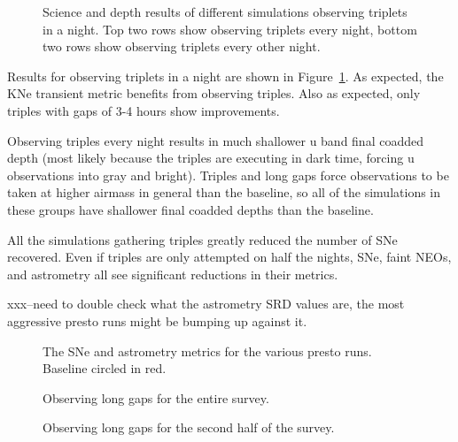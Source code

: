 \begin{figure}

\caption{ Science and depth results of different simulations observing triplets in a night. Top two rows show observing triplets every night, bottom two rows show observing triplets every other night. \label{fig:presto}}
\end{figure}


Results for observing triplets in a night are shown in Figure~\ref{fig:presto}. As expected, the KNe transient metric benefits from observing triples. Also as expected, only triples with gaps of 3-4 hours show improvements.  

Observing triples every night results in much shallower u band final coadded depth (most likely because the triples are executing in dark time, forcing u observations into gray and bright). Triples and long gaps force observations to be taken at higher airmass in general than the baseline, so all of the simulations in these groups have shallower final coadded depths than the baseline.

All the simulations gathering triples greatly reduced the number of SNe recovered. Even if triples are only attempted on half the nights, SNe, faint NEOs, and astrometry all see significant reductions in their metrics.


xxx--need to double check what the astrometry SRD values are, the most aggressive presto runs might be bumping up against it.

\begin{figure}
\caption{The SNe and astrometry metrics for the various presto runs. Baseline circled in red. \label{fig:presto_metics} }
\end{figure}


\begin{figure}
\caption{Observing long gaps for the entire survey.}
\end{figure}

\begin{figure}
\caption{Observing long gaps for the second half of the survey.}
\end{figure}


